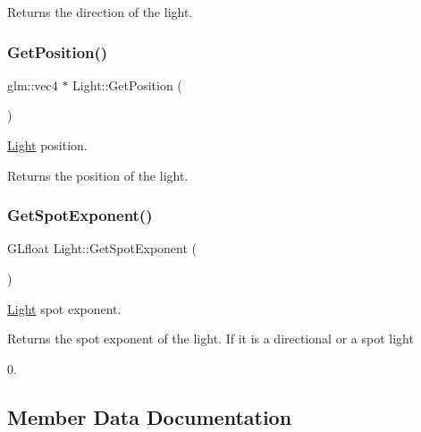 \begin{DoxyReturn}{Returns}
the direction of the light. 
\end{DoxyReturn}
\mbox{\label{class_light_a5ae42d0f1ff71f86b52ede3a37da455d}} 
\subsubsection{\texorpdfstring{Get\+Position()}{GetPosition()}}
{\footnotesize\ttfamily glm\+::vec4 $\ast$ Light\+::\+Get\+Position (\begin{DoxyParamCaption}{ }\end{DoxyParamCaption})}



\hyperlink{class_light}{Light} position. 

\begin{DoxyReturn}{Returns}
the position of the light. 
\end{DoxyReturn}
\mbox{\label{class_light_ad40e4b5500b2b8d9be2ec76dc99e8868}} 
\subsubsection{\texorpdfstring{Get\+Spot\+Exponent()}{GetSpotExponent()}}
{\footnotesize\ttfamily G\+Lfloat Light\+::\+Get\+Spot\+Exponent (\begin{DoxyParamCaption}{ }\end{DoxyParamCaption})}



\hyperlink{class_light}{Light} spot exponent. 

\begin{DoxyReturn}{Returns}
the spot exponent of the light. If it is a directional or a spot light 

0. 
\end{DoxyReturn}


\subsection{Member Data Documentation}
\mbox{\label{class_light_a3ddf6a283f42e3e3ce6a403b9477f7c2}} 
